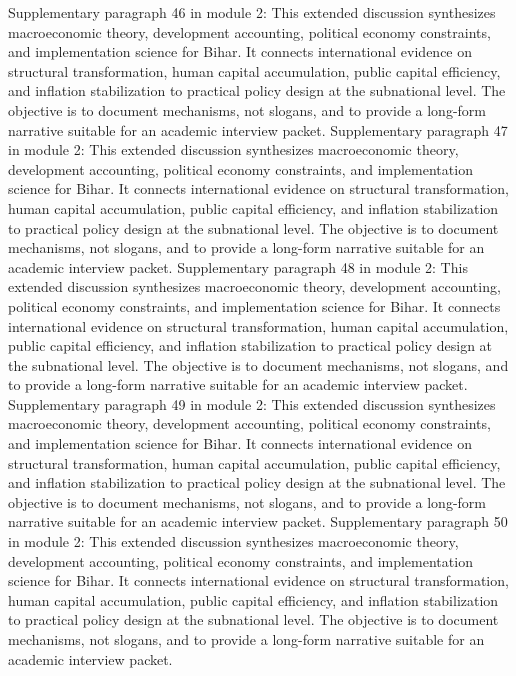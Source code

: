 \documentclass[preprint,12pt]{elsarticle}
\begin{document}
Supplementary paragraph 46 in module 2: This extended discussion synthesizes macroeconomic theory, development accounting, political economy constraints, and implementation science for Bihar. It connects international evidence on structural transformation, human capital accumulation, public capital efficiency, and inflation stabilization to practical policy design at the subnational level. The objective is to document mechanisms, not slogans, and to provide a long-form narrative suitable for an academic interview packet.
Supplementary paragraph 47 in module 2: This extended discussion synthesizes macroeconomic theory, development accounting, political economy constraints, and implementation science for Bihar. It connects international evidence on structural transformation, human capital accumulation, public capital efficiency, and inflation stabilization to practical policy design at the subnational level. The objective is to document mechanisms, not slogans, and to provide a long-form narrative suitable for an academic interview packet.
Supplementary paragraph 48 in module 2: This extended discussion synthesizes macroeconomic theory, development accounting, political economy constraints, and implementation science for Bihar. It connects international evidence on structural transformation, human capital accumulation, public capital efficiency, and inflation stabilization to practical policy design at the subnational level. The objective is to document mechanisms, not slogans, and to provide a long-form narrative suitable for an academic interview packet.
Supplementary paragraph 49 in module 2: This extended discussion synthesizes macroeconomic theory, development accounting, political economy constraints, and implementation science for Bihar. It connects international evidence on structural transformation, human capital accumulation, public capital efficiency, and inflation stabilization to practical policy design at the subnational level. The objective is to document mechanisms, not slogans, and to provide a long-form narrative suitable for an academic interview packet.
Supplementary paragraph 50 in module 2: This extended discussion synthesizes macroeconomic theory, development accounting, political economy constraints, and implementation science for Bihar. It connects international evidence on structural transformation, human capital accumulation, public capital efficiency, and inflation stabilization to practical policy design at the subnational level. The objective is to document mechanisms, not slogans, and to provide a long-form narrative suitable for an academic interview packet.
\end{document}
